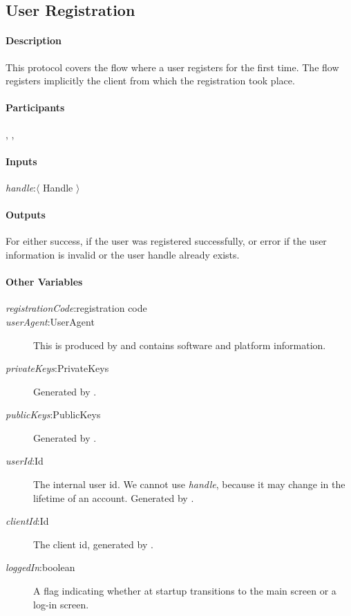 \documentclass[a4paper,10pt]{article}
\newcommand{\handle}{\emph{handle}}
\newcommand{\registrationCode}{\emph{registrationCode}}
\newcommand{\userAgent}{\emph{userAgent}}
\newcommand{\privateKeys}{\emph{privateKeys}}
\newcommand{\publicKeys}{\emph{publicKeys}}
\newcommand{\userId}{\emph{userId}}
\newcommand{\clientId}{\emph{clientId}}
\newcommand{\loggedIn}{\emph{loggedIn}}
\begin{document}
\subsection{User Registration}

\paragraph{Description}
This protocol covers the flow where a user registers for the first time. The flow registers implicitly the client from which the registration took place.

\paragraph{Participants} \Server{}, \Client{}, \User{}

\paragraph{Inputs}
\SpecialItem
\begin{description}
 \item[\handle{}:$\langle$ Handle $\rangle$]
\end{description}

\paragraph{Outputs}
For \Client{} either success, if the user was registered successfully, or error if the user information is invalid or the user handle already exists.

\paragraph{Other Variables}
\SpecialItem
\begin{description}
 \item[\registrationCode{}:registration code]
 \item[\userAgent{}:UserAgent] This is produced by \Client{} and contains software and platform information.
 \item[\privateKeys{}:PrivateKeys] Generated by \Client{}.
 \item[\publicKeys{}:PublicKeys] Generated by \Client{}.
 \item[\userId{}:Id] The internal user id. We cannot use \handle{}, because it may change in the lifetime of an account. Generated by \Server{}.
 \item[\clientId{}:Id] The client id, generated by \Server{}.
 \item[\loggedIn{}:boolean] A flag indicating whether at \Client{} startup \Client{} transitions to the main screen or a log-in screen.
\end{description}
\end{document}
